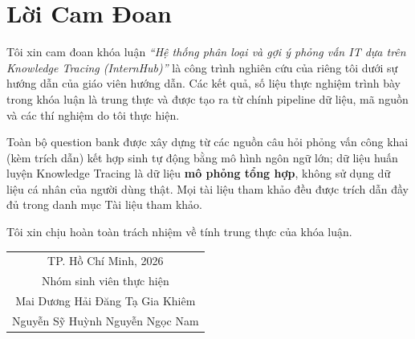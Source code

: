 \chapter*{Lời Cam Đoan}

Tôi xin cam đoan khóa luận \textit{``Hệ thống phân loại và gợi ý phỏng vấn IT dựa trên Knowledge Tracing (InternHub)''} là công trình nghiên cứu của riêng tôi dưới sự hướng dẫn của giáo viên hướng dẫn. Các kết quả, số liệu thực nghiệm trình bày trong khóa luận là trung thực và được tạo ra từ chính pipeline dữ liệu, mã nguồn và các thí nghiệm do tôi thực hiện.

Toàn bộ question bank được xây dựng từ các nguồn câu hỏi phỏng vấn công khai (kèm trích dẫn) kết hợp sinh tự động bằng mô hình ngôn ngữ lớn; dữ liệu huấn luyện Knowledge Tracing là dữ liệu \textbf{mô phỏng tổng hợp}, không sử dụng dữ liệu cá nhân của người dùng thật. Mọi tài liệu tham khảo đều được trích dẫn đầy đủ trong danh mục Tài liệu tham khảo.

Tôi xin chịu hoàn toàn trách nhiệm về tính trung thực của khóa luận.

\vspace{1.5cm}
\hfill\begin{tabular}{c}
TP. Hồ Chí Minh, 2026 \\
Nhóm sinh viên thực hiện \\[2.5cm]
Mai Dương Hải Đăng \quad Tạ Gia Khiêm \\
Nguyễn Sỹ Huỳnh \quad Nguyễn Ngọc Nam \\
\end{tabular}
